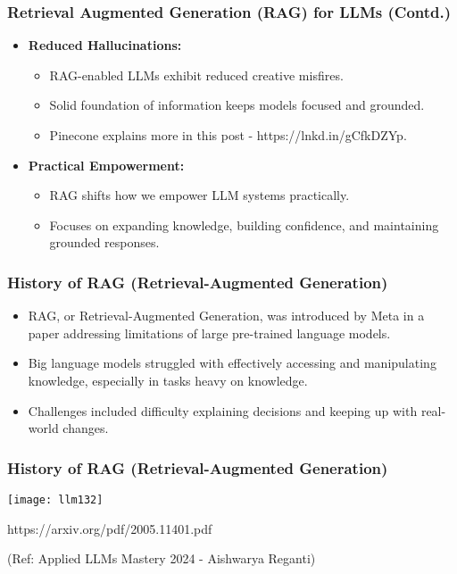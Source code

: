\begin{frame}[fragile]\frametitle{Retrieval Augmented Generation (RAG) for LLMs (Contd.)}

\begin{itemize}
  \item \textbf{Reduced Hallucinations:}
    \begin{itemize}
      \item RAG-enabled LLMs exhibit reduced creative misfires.
      \item Solid foundation of information keeps models focused and grounded.
      \item Pinecone explains more in this post - https://lnkd.in/gCfkDZYp.
    \end{itemize}

  \item \textbf{Practical Empowerment:}
    \begin{itemize}
      \item RAG shifts how we empower LLM systems practically.
      \item Focuses on expanding knowledge, building confidence, and maintaining grounded responses.
    \end{itemize}
\end{itemize}

\end{frame}

\begin{frame}[fragile]\frametitle{History of RAG (Retrieval-Augmented Generation)}
  \begin{itemize}
    \item RAG, or Retrieval-Augmented Generation, was introduced by Meta in a paper addressing limitations of large pre-trained language models.
    \item Big language models struggled with effectively accessing and manipulating knowledge, especially in tasks heavy on knowledge.
    \item Challenges included difficulty explaining decisions and keeping up with real-world changes.
  \end{itemize}
\end{frame}

\begin{frame}[fragile]\frametitle{History of RAG (Retrieval-Augmented Generation)}

\begin{center}
\texttt{[image: llm132]}
\end{center}				


https://arxiv.org/pdf/2005.11401.pdf

{\tiny (Ref: Applied LLMs Mastery 2024 - Aishwarya Reganti)}

\end{frame}

